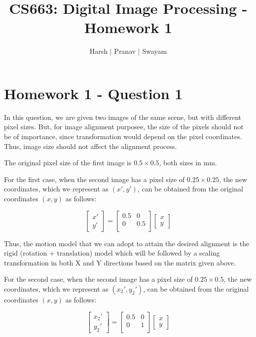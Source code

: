 \documentclass{article}
\title{CS663: Digital Image Processing - Homework 1}
\author{Harsh $\vert$ Pranav $\vert$ Swayam}
\begin{document}
\maketitle
\section{Homework 1 - Question 1}

In this question, we are given two images of the same scene, but with different pixel sizes. But, for image alignment purposee, the size of the pixels should not be of importance, since transformation would depend on the pixel coordinates. Thus, image size should not affect the alignment process.

The original pixel size of the first image is $0.5 \times 0.5$, both sizes in mm.

\vspace{10pt}
For the first case, when the second image has a pixel size of $0.25 \times 0.25$, the new coordinates, which we represent as $(x', y')$, can be obtained from the original coordinates $(x, y)$ as follows:

\begin{equation}
\begin{bmatrix}
x' \\
y' 
\end{bmatrix}
=
\begin{bmatrix}
0.5 & 0 \\
0 & 0.5 \\
\end{bmatrix}
\begin{bmatrix}
x \\
y 
\end{bmatrix}
\end{equation}

Thus, the motion model that we can adopt to attain the desired alignment is the rigid (rotation + translation) model which will be followed by a scaling transformation in both X and Y directions based on the matrix given above.

\hrulefill
\vspace{5pt}

For the second case, when the second image has a pixel size of $0.25 \times 0.5$, the new coordinates, which we represent as $(x_2', y_2')$, can be obtained from the original coordinates $(x, y)$ as follows:

\begin{equation}
\begin{bmatrix}
x_2' \\
y_2'
\end{bmatrix}
=
\begin{bmatrix}
0.5 & 0 \\
0 & 1 \\
\end{bmatrix}
\begin{bmatrix}
x \\
y
\end{bmatrix}
\end{equation}
\end{document}
